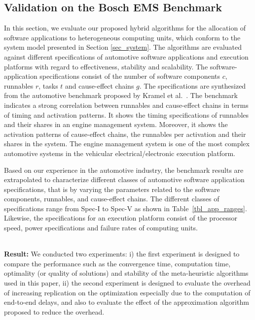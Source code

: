 \subsection{Validation on the Bosch EMS Benchmark} 
In this section, we evaluate our proposed hybrid \pso{} algorithms for the allocation of software applications to heterogeneous computing units, which conform to the system model presented in Section \ref{sec_system}. The algorithms are evaluated against different specifications of automotive software applications and execution platforms with regard to effectiveness, stability and scalability. The software-application specifications consist of the number of software components $c$, runnables $r$, tasks $t$ and cause-effect chains $g$.  The specifications are synthesized from the automotive benchmark proposed by Kramel et al.~\cite{Kramer2015RealFree}. The benchmark indicates a strong correlation between runnables and cause-effect chains in terms of timing and activation patterns. It shows the timing specifications of runnables and their shares in an engine management system. Moreover, it shows the activation patterns of cause-effect chains, the runnables per activation and their shares in the system. The engine management system is one of the most complex automotive systems in the vehicular electrical/electronic execution platform. 

Based on our experience in the automotive industry, the benchmark results  are extrapolated to characterize different classes of automotive software application specifications, that is by varying the parameters related to the software components, runnables, and cause-effect chains. The different classes of specifications range from Spec-I to Spec-V as shown in Table~\ref{tbl_app_ranges}. Likewise, the specifications for an execution platform consist of the processor speed, power specifications and failure rates of computing units.

\noindent\\ \textbf{Result:} We conducted two experiments: i) the first experiment is designed to compare the performance such as the convergence time, computation time, optimality (or quality of solutions) and stability of the meta-heuristic algorithms used in this paper, ii) the second experiment is designed to evaluate the overhead of increasing replication on the optimization especially due to the computation of end-to-end delays, and also to evaluate the effect of the approximation algorithm proposed to reduce the overhead.

